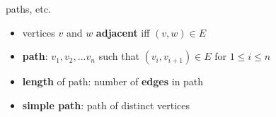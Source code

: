 \begin{frame}{paths, etc.}
\begin{itemize}
\item vertices $v$ and $w$ \textbf{adjacent} iff $(v,w) \in E$
\item \textbf{path}: $v_1, v_2, \ldots v_n$ such that $(v_i, v_{i+1}) \in E$ for $1 \le i \le n$
\item \textbf{length} of path: number of \textbf{edges} in path
\item \textbf{simple path}: path of distinct vertices
\end{itemize}
\end{frame}
